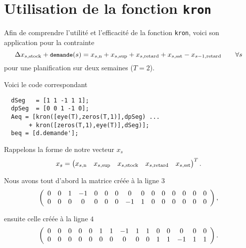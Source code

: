 \section{Utilisation de la fonction \texttt{kron}}
\label{app:kron}

\lstset{language=MATLAB}

Afin de comprendre l'utilité et l'efficacité de la fonction \texttt{kron},
voici son application pour la contrainte
\[ 
  \Delta x_{s,\text{stock}} + {\small\texttt{demande}}(s) = x_{s,\text{n}} + x_{s,\text{sup}} 
  + x_{s,\text{retard}} + x_{s,\text{sst}} - x_{s-1,\text{retard}} \qquad \forall s
\]
pour une planification sur deux semaines ($T=2$).

Voici le code correspondant
\begin{lstlisting}
  dSeg   = [1 1 -1 1 1];
  dpSeg  = [0 0 1 -1 0];
  Aeq = [kron([eye(T),zeros(T,1)],dpSeg) ...
       + kron([zeros(T,1),eye(T)],dSeg)];
  beq = [d.demande'];   
\end{lstlisting}

Rappelons la forme de notre vecteur $x_s$
\[ x_s = 
  \begin{pmatrix} 
    x_{s,\text{n}} &x_{s,\text{sup}} &x_{s,\text{stock}} &x_{s,\text{retard}} &x_{s,\text{sst}}
  \end{pmatrix}^T.
\]

Nous avons tout d'abord la matrice créée à la ligne $3$
\[
    \left(
    \begin{array}{*{15}c}
      0 & 0 & 1 & -1 & 0 & 0 & 0 &  0 & 0 & 0 & 0 & 0 & 0 & 0 & 0 \\
      0 & 0 & 0 &  0 & 0 & 0 & 0 & -1 & 1 & 0 & 0 & 0 & 0 & 0 & 0 
    \end{array}
    \right),
\]

ensuite celle créée à la ligne $4$
\[
    \left(
    \begin{array}{*{15}c}
      0 & 0 & 0 & 0 & 0 & 1 & 1 & -1 & 1 & 1 & 0 & 0 & 0 & 0 & 0 \\
      0 & 0 & 0 & 0 & 0 & 0 & 0 &  0 & 0 & 0 & 1 & 1 & -1 & 1 & 1 
    \end{array}
    \right).
\]

